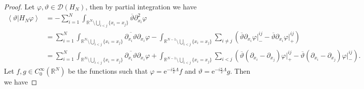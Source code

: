 \documentclass[a4paper,11pt]{article}
\newcommand{\euler}[1]{\text{e}^{#1}}
\renewcommand{\braket}[1]{\left\langle#1\right\rangle}
\newcommand{\R}{\mathbb{R}}
\numberwithin{equation}{section}
\begin{document}
			\begin{proof}
				Let $ \varphi,\vartheta\in \mathcal{D}(H_N) $, then by partial integration we have \begin{equation}
				\begin{aligned}
				\braket{\vartheta\vert H_N \varphi}&=-\sum_{i=1}^{N}\int_{\R^N\setminus\bigcup_{i<j}\{x_i=x_j\}}\overline{\vartheta} \partial_{x_i}^2\varphi\\&=\sum_{i=1}^{N}\int_{\R^N\setminus\bigcup_{i<j}\{x_i=x_j\}}\overline{\partial_{x_i}\vartheta}\partial_{x_i}\varphi-\int_{\R^{N-1}\setminus\bigcup_{i<j}\{x_i=x_j\}}\sum_{i\neq j}\left(\overline{\vartheta}\partial_{x_i}\varphi\vert^{ij}_--\overline{\vartheta}\partial_{x_i}\varphi\vert^{ij}_+\right)\\
				&=\sum_{i=1}^{N}\int_{\R^N\setminus\bigcup_{i<j}\{x_i=x_j\}}\overline{\partial_{x_i}\vartheta}\partial_{x_i}\varphi+\int_{\R^{N-1}\setminus\bigcup_{i<j}\{x_i=x_j\}}\sum_{i< j}\left(\overline{\vartheta}(\partial_{x_i}-\partial_{x_j})\varphi\vert^{ij}_+-\overline{\vartheta}(\partial_{x_i}-\partial_{x_j})\varphi\vert^{ij}_-\right).
				\end{aligned}
				\end{equation}
				Let $ f,g\in C^\infty_0(\R^N) $ be the functions such that $ \varphi=\euler{-i\frac{\kappa}{2}\Lambda}f $ and $ \vartheta=\euler{-i\frac{\kappa}{2}\Lambda}g $. Then we have
				

\end{proof}
\end{document}

